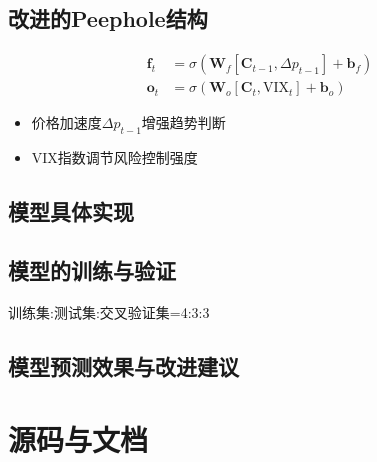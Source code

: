 \documentclass[a4paper,12pt]{ctexart}
\begin{document}
\subsection*{改进的Peephole结构}
\begin{equation*}
\begin{aligned}
\mathbf{f}_t &= \sigma\left(\mathbf{W}_f[\mathbf{C}_{t-1}, \Delta p_{t-1}] + \mathbf{b}_f\right) \\
\mathbf{o}_t &= \sigma\left(\mathbf{W}_o[\mathbf{C}_t, \text{VIX}_t] + \mathbf{b}_o\right)
\end{aligned}
\end{equation*}
\begin{itemize}
\item 价格加速度$\Delta p_{t-1}$增强趋势判断
\item VIX指数调节风险控制强度
\end{itemize}




\newpage
\subsection{模型具体实现}

\newpage
\subsection{模型的训练与验证}
训练集:测试集:交叉验证集=4:3:3

\newpage
\subsection{模型预测效果与改进建议}

\newpage


\section{源码与文档}
\end{document}
